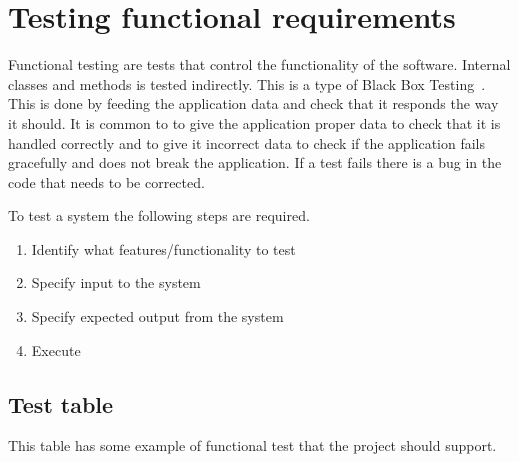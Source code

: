 \section{Testing functional requirements}
\label{sec:funcTest}
Functional testing are tests that control the functionality of the software. Internal classes and methods is tested indirectly. This is a type of Black Box Testing~\cite{blackbox}. This is done by feeding the application data and check that it responds the way it should. It is common to to give the application proper data to check that it is handled correctly and to give it incorrect data to check if the application fails gracefully and does not break the application. If a test fails there is a bug in the code that needs to be corrected.

To test a system the following steps are required.
\begin{enumerate}
\item Identify what features/functionality to test
\item Specify input to the system
\item Specify expected output from the system
\item Execute
\end{enumerate}

\subsection{Test table}
This table has some example of functional test that the project should support.


